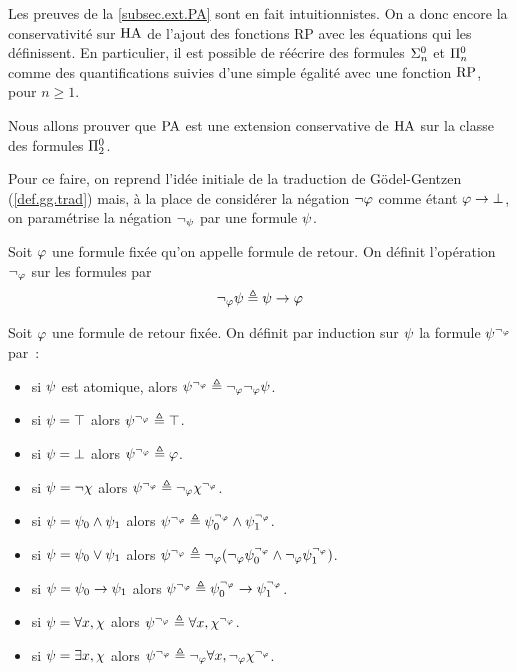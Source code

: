 \begin{remark}
  Les preuves de la \cref{subsec.ext.PA} sont en fait intuitionnistes. On a
  donc encore la conservativité sur $\operatorname{HA}$ de l'ajout des fonctions RP avec
  les équations qui les définissent. En particulier, il est possible de
  réécrire des formules $\Sigma^0_{n}$ et $\Pi^0_{n}$ comme des
  quantifications suivies d'une simple égalité avec une fonction $\operatorname{RP}$, pour
  $n \geq 1$.
\end{remark}

Nous allons prouver que $\operatorname{PA}$ est une extension conservative de $\operatorname{HA}$
sur la classe des formules $\Pi^0_{2}$.

Pour ce faire, on reprend l'idée initiale de la traduction de Gödel-Gentzen
(\cref{def.gg.trad}) mais, à la place de considérer la négation
$\lnot \varphi$ comme étant $\varphi \to \bot$, on paramétrise la négation
$\lnot_\psi$ par une formule $\psi$.

\begin{definition}
  Soit $\varphi$ une formule fixée qu'on appelle formule de retour. On définit
  l'opération $\lnot_\varphi$ sur les formules par
  \[\lnot_\varphi \psi \triangleq \psi \to \varphi\]
\end{definition}

\begin{definition}\label{def.friedman}
  Soit $\varphi$ une formule de retour fixée. On définit par induction sur
  $\psi$ la formule $\psi^{\lnot_\varphi}$ par~:
  \begin{itemize}
  \item si $\psi$ est atomique, alors
    $\psi^{\lnot_\varphi} \triangleq \lnot_\varphi\lnot_\varphi \psi$.
  \item si $\psi = \top$ alors $\psi^{\lnot_\varphi} \triangleq \top$.
  \item si $\psi = \bot$ alors $\psi^{\lnot_\varphi} \triangleq \varphi$.
  \item si $\psi = \lnot \chi$ alors
    $\psi^{\lnot_\varphi} \triangleq \lnot_\varphi \chi^{\lnot_\varphi}$.
  \item si $\psi = \psi_0 \land \psi_1$ alors
    $\psi^{\lnot_\varphi} \triangleq \psi_0^{\lnot_\varphi}\land\psi_1^{\lnot_\varphi}$.
  \item si $\psi = \psi_0 \lor \psi_1$ alors
    $\psi^{\lnot_\varphi} \triangleq
    \lnot_\varphi(\lnot_\varphi\psi_0^{\lnot_\varphi}\land
    \lnot_\varphi\psi_1^{\lnot_\varphi})$.
  \item si $\psi = \psi_0 \to \psi_1$ alors
    $\psi^{\lnot_\varphi} \triangleq \psi_0^{\lnot_\varphi}\to\psi_1^{\lnot_\varphi}$.
  \item si $\psi = \forall x, \chi$ alors
    $\psi^{\lnot_\varphi} \triangleq \forall x, \chi^{\lnot_\varphi}$.
  \item si $\psi = \exists x, \chi$ alors
    $\psi^{\lnot_\varphi} \triangleq
    \lnot_\varphi\forall x, \lnot_\varphi \chi^{\lnot_\varphi}$.
  \end{itemize}
\end{definition}

